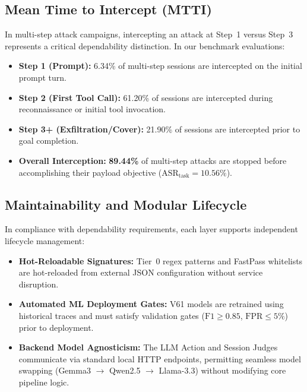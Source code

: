 \documentclass[conference]{IEEEtran}
\begin{document}
\subsection{Mean Time to Intercept (MTTI)}
In multi-step attack campaigns, intercepting an attack at Step~1 versus Step~3 represents a critical dependability distinction. In our benchmark evaluations:
\begin{itemize}[leftmargin=*]
    \item \textbf{Step 1 (Prompt):} 6.34\% of multi-step sessions are intercepted on the initial prompt turn.
    \item \textbf{Step 2 (First Tool Call):} 61.20\% of sessions are intercepted during reconnaissance or initial tool invocation.
    \item \textbf{Step 3+ (Exfiltration/Cover):} 21.90\% of sessions are intercepted prior to goal completion.
    \item \textbf{Overall Interception:} \textbf{89.44\%} of multi-step attacks are stopped before accomplishing their payload objective ($\text{ASR}_{\text{task}} = 10.56\%$).
\end{itemize}

\subsection{Maintainability and Modular Lifecycle}
In compliance with dependability requirements, each layer supports independent lifecycle management:
\begin{itemize}[leftmargin=*]
    \item \textbf{Hot-Reloadable Signatures:} Tier~0 regex patterns and FastPass whitelists are hot-reloaded from external JSON configuration without service disruption.
    \item \textbf{Automated ML Deployment Gates:} V61 models are retrained using historical traces and must satisfy validation gates ($\text{F1} \geq 0.85$, $\text{FPR} \leq 5\%$) prior to deployment.
    \item \textbf{Backend Model Agnosticism:} The LLM Action and Session Judges communicate via standard local HTTP endpoints, permitting seamless model swapping (Gemma3 $\to$ Qwen2.5 $\to$ Llama-3.3) without modifying core pipeline logic.
\end{itemize}

\end{document}
